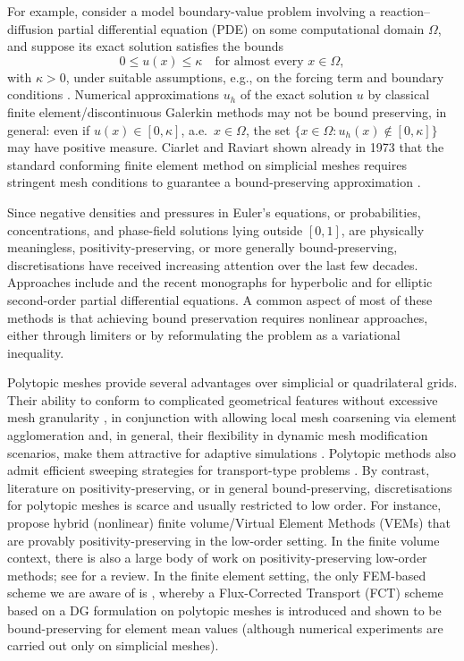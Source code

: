 \documentclass[11pt,final]{amsart}
\theoremstyle{plain}
\theoremstyle{definition}
\begin{document}
For example, consider a model boundary-value problem involving a reaction--diffusion partial differential equation (PDE) on some computational domain $\Omega$, and suppose its exact solution satisfies the bounds
\[
   0 \leq u(x) \leq \kappa \quad \text{for almost every } x \in \Omega ,
\]
with $\kappa > 0$, under suitable assumptions, e.g., on the forcing term and
boundary conditions \cite{renardy2006introduction}. Numerical approximations $u_h$ of the exact solution $u$ by classical
finite element/discontinuous Galerkin methods may not be bound preserving, in
general: even if  $u(x)\in[0,\kappa]$, a.e.~$x \in \Omega$,  the set $\{x
\in \Omega : u_h(x) \notin [0,\kappa]\}$ may have positive
measure. Ciarlet and Raviart shown already in 1973  that the standard conforming finite element
method on simplicial meshes requires stringent mesh conditions to
guarantee a bound-preserving approximation \cite{CR73}.

Since negative densities and pressures in Euler's equations, or
probabilities, concentrations, and phase-field solutions lying outside
$[0,1]$, are physically meaningless, positivity-preserving, or more
generally bound-preserving, discretisations have received increasing
attention over the last few decades.  Approaches include
\cite{XZ99,BE05,DDS05,lipnikov2007monotone,Kuz07,EHS09,LMS11,
  BBK17-NumMath,vdVXX19,ChengShen22,HuanChen23,Kirby4755186} and the
recent monographs \cite{Kuzmin-book} for hyperbolic and
\cite{BJK-book} for elliptic second-order partial differential
equations. A common aspect of most of these methods is that achieving
bound preservation requires nonlinear approaches, either through
limiters or by reformulating the problem as a variational inequality.

Polytopic meshes provide several advantages over simplicial or
quadrilateral grids. Their ability to conform to complicated
geometrical features without excessive mesh granularity \cite{DG-EASE}, in conjunction with allowing local mesh coarsening via element agglomeration and, in general, their flexibility in dynamic mesh modification scenarios, make them attractive
for adaptive simulations \cite{cangiani2017hp, cangiani_VEM2017, cangianiVEMpar2021, cangiani2023}. Polytopic methods also admit efficient sweeping strategies for transport-type problems \cite{calloo2025cycle}. By
contrast, literature on positivity-preserving, or in general bound-preserving, discretisations for
polytopic meshes is scarce and usually restricted to low order. For
instance, \cite{ST22-VEM,SYG23-VEM} propose hybrid (nonlinear) finite
volume/Virtual Element Methods (VEMs) that are provably positivity-preserving in the low-order setting. In the finite volume
context, there is also a large body of work on positivity-preserving
low-order methods; see \cite{Droniou14} for a review. In the finite
element setting, the only FEM-based scheme we are aware of is
\cite{FRK20}, whereby a Flux-Corrected Transport (FCT) scheme based on a
DG formulation on polytopic meshes is introduced and shown to be
bound-preserving for element mean values (although numerical
experiments are carried out only on simplicial meshes).
\end{document}
